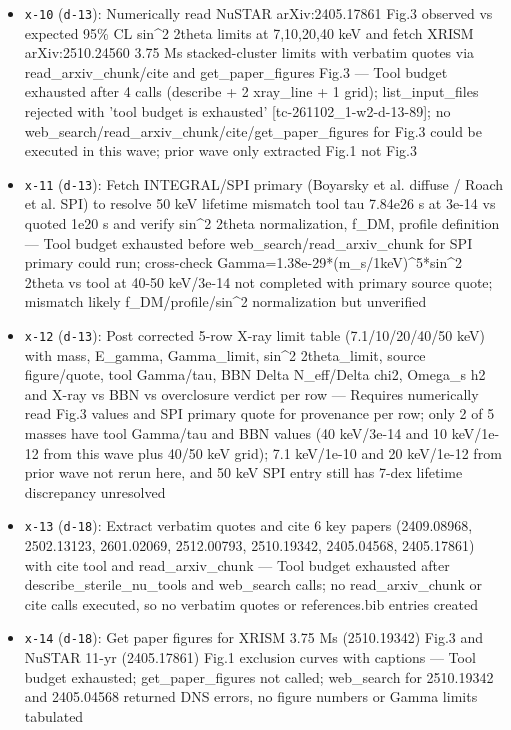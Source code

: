 \documentclass[11pt,a4paper]{article}
\begin{document}
\begin{itemize}
  \item \texttt{x-10} (\texttt{d-13}): Numerically read NuSTAR arXiv:2405.17861 Fig.3 observed vs expected 95\% CL sin\textasciicircum{}2 2theta limits at 7,10,20,40 keV and fetch XRISM arXiv:2510.24560 3.75 Ms stacked-cluster limits with verbatim quotes via read\_arxiv\_chunk/cite and get\_paper\_figures Fig.3 --- Tool budget exhausted after 4 calls (describe + 2 xray\_line + 1 grid); list\_input\_files rejected with 'tool budget is exhausted' [tc-261102\_1-w2-d-13-89]; no web\_search/read\_arxiv\_chunk/cite/get\_paper\_figures for Fig.3 could be executed in this wave; prior wave only extracted Fig.1 not Fig.3
  \item \texttt{x-11} (\texttt{d-13}): Fetch INTEGRAL/SPI primary (Boyarsky et al. diffuse / Roach et al. SPI) to resolve 50 keV lifetime mismatch tool tau 7.84e26 s at 3e-14 vs quoted 1e20 s and verify sin\textasciicircum{}2 2theta normalization, f\_DM, profile definition --- Tool budget exhausted before web\_search/read\_arxiv\_chunk for SPI primary could run; cross-check Gamma=1.38e-29*(m\_s/1keV)\textasciicircum{}5*sin\textasciicircum{}2 2theta vs tool at 40-50 keV/3e-14 not completed with primary source quote; mismatch likely f\_DM/profile/sin\textasciicircum{}2 normalization but unverified
  \item \texttt{x-12} (\texttt{d-13}): Post corrected 5-row X-ray limit table (7.1/10/20/40/50 keV) with mass, E\_gamma, Gamma\_limit, sin\textasciicircum{}2 2theta\_limit, source figure/quote, tool Gamma/tau, BBN Delta N\_eff/Delta chi2, Omega\_s h2 and X-ray vs BBN vs overclosure verdict per row --- Requires numerically read Fig.3 values and SPI primary quote for provenance per row; only 2 of 5 masses have tool Gamma/tau and BBN values (40 keV/3e-14 and 10 keV/1e-12 from this wave plus 40/50 keV grid); 7.1 keV/1e-10 and 20 keV/1e-12 from prior wave not rerun here, and 50 keV SPI entry still has 7-dex lifetime discrepancy unresolved
  \item \texttt{x-13} (\texttt{d-18}): Extract verbatim quotes and cite 6 key papers (2409.08968, 2502.13123, 2601.02069, 2512.00793, 2510.19342, 2405.04568, 2405.17861) with cite tool and read\_arxiv\_chunk --- Tool budget exhausted after describe\_sterile\_nu\_tools and web\_search calls; no read\_arxiv\_chunk or cite calls executed, so no verbatim quotes or references.bib entries created
  \item \texttt{x-14} (\texttt{d-18}): Get paper figures for XRISM 3.75 Ms (2510.19342) Fig.3 and NuSTAR 11-yr (2405.17861) Fig.1 exclusion curves with captions --- Tool budget exhausted; get\_paper\_figures not called; web\_search for 2510.19342 and 2405.04568 returned DNS errors, no figure numbers or Gamma limits tabulated

\end{itemize}
\end{document}
